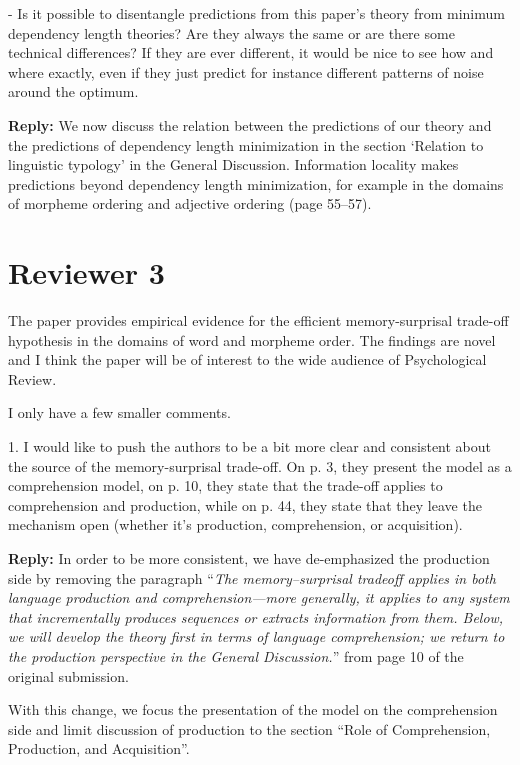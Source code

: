 \documentclass{article}[11pt,a4paper,oneside]
\newenvironment{reply}
  {\par\medskip
   \color{blue}%
   \begin{framed}
   \textbf{Reply: }\ignorespaces}
 {\end{framed}
  \medskip}
\begin{document}
- Is it possible to disentangle predictions from this paper's theory from minimum dependency length theories? Are they always the same or are there some technical differences? If they are ever different, it would be nice to see how and where exactly, even if they just predict for instance different patterns of noise around the optimum.


\begin{reply}
	We now discuss the relation between the predictions of our theory and the predictions of dependency length minimization in the section `Relation to linguistic typology' in the General Discussion. Information locality makes predictions beyond dependency length minimization, for example in the domains of morpheme ordering and adjective ordering (page 55--57). 
\end{reply}



\section{Reviewer 3}

The paper provides empirical evidence for the efficient memory-surprisal trade-off hypothesis in the domains of word and morpheme order. The findings are novel and I think the paper will be of interest to the wide audience of Psychological Review.

I only have a few smaller comments.

1. I would like to push the authors to be a bit more clear and consistent about the source of the memory-surprisal trade-off. On p. 3, they present the model as a comprehension model, on p. 10, they state that the trade-off applies to comprehension and production, while on p. 44, they state that they leave the mechanism open (whether it's production, comprehension, or acquisition).

\begin{reply}
	In order to be more consistent, we have de-emphasized the production side by removing the paragraph ``\textit{The memory--surprisal tradeoff applies in both language production and comprehension---more generally, it applies to any system that incrementally produces sequences or extracts information from them. Below, we will develop the theory first in terms of language comprehension; we return to the production perspective in the General Discussion.}'' from page 10 of the original submission.

	With this change, we focus the presentation of the model on the comprehension side and limit discussion of production to the section ``Role of Comprehension, Production, and Acquisition''.
\end{reply}
\end{document}
